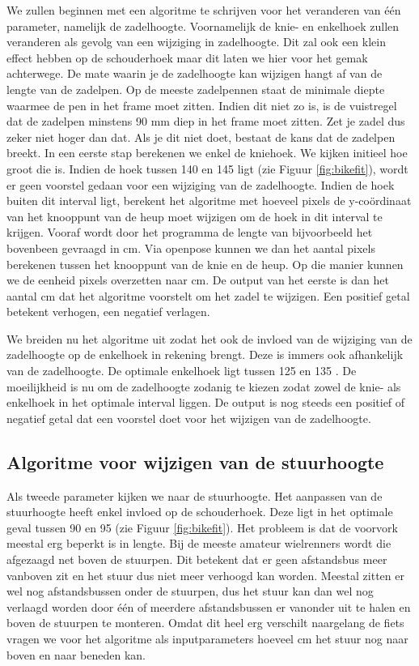 \documentclass[a4paper,twoside,kulak]{kulakreport}
\begin{document}
We zullen beginnen met een algoritme te schrijven voor het veranderen van één parameter, namelijk de zadelhoogte. Voornamelijk de knie- en enkelhoek zullen veranderen als gevolg van een wijziging in zadelhoogte. Dit zal ook een klein effect hebben op de schouderhoek maar dit laten we hier voor het gemak achterwege. De mate waarin je de zadelhoogte kan wijzigen hangt af van de lengte van de zadelpen. Op de meeste zadelpennen staat de minimale diepte waarmee de pen in het frame moet zitten. Indien dit niet zo is, is de vuistregel dat de zadelpen minstens 90 \si{mm} diep in het frame moet zitten. Zet je zadel dus zeker niet hoger dan dat. Als je dit niet doet, bestaat de kans dat de zadelpen breekt.
In een eerste stap berekenen we enkel de kniehoek. We kijken initieel hoe groot die is. Indien de hoek tussen 140 \degree en 145 \degree ligt (zie Figuur \ref{fig:bikefit}), wordt er geen voorstel gedaan voor een wijziging van de zadelhoogte. Indien de hoek buiten dit interval ligt, berekent het algoritme met hoeveel pixels de y-coördinaat van het knooppunt van de heup moet wijzigen om de hoek in dit interval te krijgen. Vooraf wordt door het programma de lengte van bijvoorbeeld het bovenbeen gevraagd in \si{cm}. Via openpose kunnen we dan het aantal pixels berekenen tussen het knooppunt van de knie en de heup. Op die manier kunnen we de eenheid pixels overzetten naar \si{cm}. De output van het eerste is dan het aantal \si{cm} dat het algoritme voorstelt om het zadel te wijzigen. Een positief getal betekent verhogen, een negatief verlagen.

We breiden nu het algoritme uit zodat het ook de invloed van de wijziging van de zadelhoogte op de enkelhoek in rekening brengt. Deze is immers ook afhankelijk van de zadelhoogte. De optimale enkelhoek ligt tussen 125 \degree en 135 \degree. De moeilijkheid is nu om de zadelhoogte zodanig te kiezen zodat zowel de knie- als enkelhoek in het optimale interval liggen. De output is nog steeds een positief of negatief getal dat een voorstel doet voor het wijzigen van de zadelhoogte.

\subsection{Algoritme voor wijzigen van de stuurhoogte}

Als tweede parameter kijken we naar de stuurhoogte. Het aanpassen van de stuurhoogte heeft enkel invloed op de schouderhoek. Deze ligt in het optimale geval tussen 90 \degree en 95 \degree (zie Figuur \ref{fig:bikefit}). Het probleem is dat de voorvork meestal erg beperkt is in lengte. Bij de meeste amateur wielrenners wordt die afgezaagd net boven de stuurpen. Dit betekent dat er geen afstandsbus meer vanboven zit en het stuur dus niet meer verhoogd kan worden. Meestal zitten er wel nog afstandsbussen onder de stuurpen, dus het stuur kan dan wel nog verlaagd worden door één of meerdere afstandsbussen er vanonder uit te halen en boven de stuurpen te monteren. Omdat dit heel erg verschilt naargelang de fiets vragen we voor het algoritme als inputparameters hoeveel \si{cm} het stuur nog naar boven en naar beneden kan.
\end{document}

